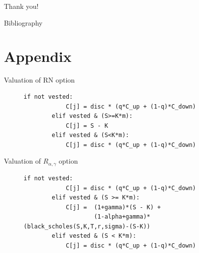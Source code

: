 \documentclass[compress]{beamer}
\begin{document}
\begin{frame}{}
    \begin{center}
        \Huge Thank you!
    \end{center}
\end{frame}



\appendix
\begin{frame}[allowframebreaks]{Bibliography}
    \printbibliography
\end{frame}



\section*{Appendix}
\begin{frame}[fragile]{Valuation of RN option}
    \begin{figure}[H]
        \begin{lstlisting}[breaklines, basicstyle=\ttfamily\scriptsize]
        if not vested: 
            C[j] = disc * (q*C_up + (1-q)*C_down)
        elif vested & (S>=K*m):            
            C[j] = S - K
        elif vested & (S<K*m):
            C[j] = disc * (q*C_up + (1-q)*C_down)
        \end{lstlisting}
     \label{fig:val_rn}
    \end{figure}
\end{frame}


\begin{frame}[fragile]{Valuation of $R_{\alpha, \gamma}$ option}
    \begin{figure}[h]
        \begin{lstlisting}[breaklines, basicstyle=\ttfamily\scriptsize] 
        if not vested:                         
            C[j] = disc * (q*C_up + (1-q)*C_down)
        elif vested & (S >= K*m):                
            C[j] =  (1+gamma)*(S - K) + 
                    (1-alpha+gamma)*(black_scholes(S,K,T,r,sigma)-(S-K))
        elif vested & (S < K*m):  
            C[j] = disc * (q*C_up + (1-q)*C_down)
        \end{lstlisting}
        \label{fig:val_r}
    \end{figure}
\end{frame}
\end{document}
